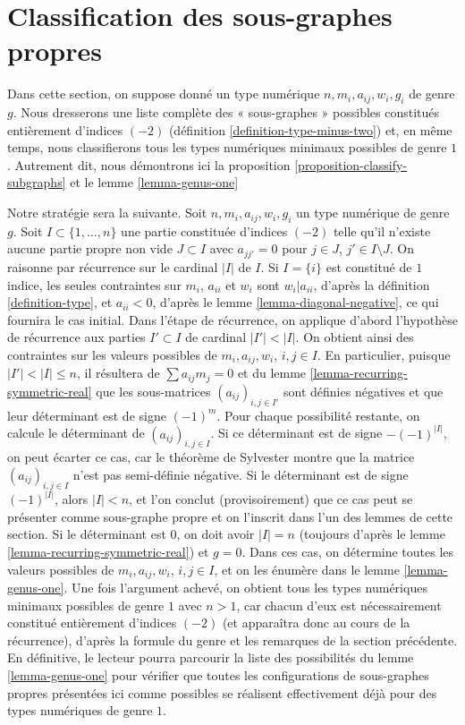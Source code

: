\section{Classification des sous-graphes propres}
\label{section-classify-proper-subgraphs}

\noindent
Dans cette section, on suppose donné un type numérique
$n, m_i, a_{ij}, w_i, g_i$ de genre $g$. Nous dresserons
une liste complète des « sous-graphes » possibles constitués entièrement
d'indices $(-2)$ (définition \ref{definition-type-minus-two}) et,
en même temps, nous classifierons tous les types numériques
minimaux possibles de genre $1$. Autrement dit, nous démontrons ici la
proposition \ref{proposition-classify-subgraphs} et le
lemme \ref{lemma-genus-one}

\medskip\noindent
Notre stratégie sera la suivante. Soit $n, m_i, a_{ij}, w_i, g_i$
un type numérique de genre $g$. Soit $I \subset \{1, \ldots, n\}$ une partie
constituée d'indices $(-2)$ telle qu'il n'existe aucune partie propre non vide
$J \subset I$ avec $a_{jj'} = 0$ pour $j \in J$, $j' \in I \setminus J$.
On raisonne par récurrence sur le cardinal $|I|$ de $I$. Si $I = \{i\}$
est constitué de $1$ indice, les seules contraintes sur $m_i$, $a_{ii}$
et $w_i$ sont $w_i | a_{ii}$, d'après la définition \ref{definition-type},
et $a_{ii} < 0$, d'après le lemme \ref{lemma-diagonal-negative},
ce qui fournira le cas initial. Dans l'étape de récurrence,
on applique d'abord l'hypothèse de récurrence aux parties $I' \subset I$
de cardinal $|I'| < |I|$. On obtient ainsi des contraintes sur les valeurs possibles
de $m_i, a_{ij}, w_i$, $i, j \in I$. En particulier, puisque $|I'| < |I| \leq n$,
il résultera de $\sum a_{ij}m_j = 0$ et du
lemme \ref{lemma-recurring-symmetric-real} que les
sous-matrices $(a_{ij})_{i, j \in I'}$ sont définies négatives
et que leur déterminant est de signe $(-1)^m$.
Pour chaque possibilité restante, on calcule le déterminant de
$(a_{ij})_{i, j \in I}$. Si ce déterminant est de signe $-(-1)^{|I|}$,
on peut écarter ce cas, car le théorème de Sylvester montre
que la matrice $(a_{ij})_{i, j \in I}$ n'est pas semi-définie négative.
Si le déterminant est de signe $(-1)^{|I|}$, alors $|I| < n$, et l'on
conclut (provisoirement) que ce cas peut se présenter comme sous-graphe propre
et on l'inscrit dans l'un des lemmes de cette section.
Si le déterminant est $0$, on doit avoir $|I| = n$
(toujours d'après le lemme \ref{lemma-recurring-symmetric-real}) et $g = 0$.
Dans ces cas, on détermine toutes les valeurs possibles de $m_i, a_{ij}, w_i$, $i, j \in I$,
et on les énumère dans le lemme \ref{lemma-genus-one}. Une fois l'argument
achevé, on obtient tous les types numériques minimaux possibles de genre
$1$ avec $n > 1$, car chacun d'eux est nécessairement constitué entièrement
d'indices $(-2)$ (et apparaîtra donc au cours de la récurrence),
d'après la formule du genre et les remarques de la section précédente.
En définitive, le lecteur pourra parcourir la liste des
possibilités du lemme \ref{lemma-genus-one} pour vérifier que toutes les
configurations de sous-graphes propres présentées ici comme possibles
se réalisent effectivement déjà pour des types numériques de genre $1$.

